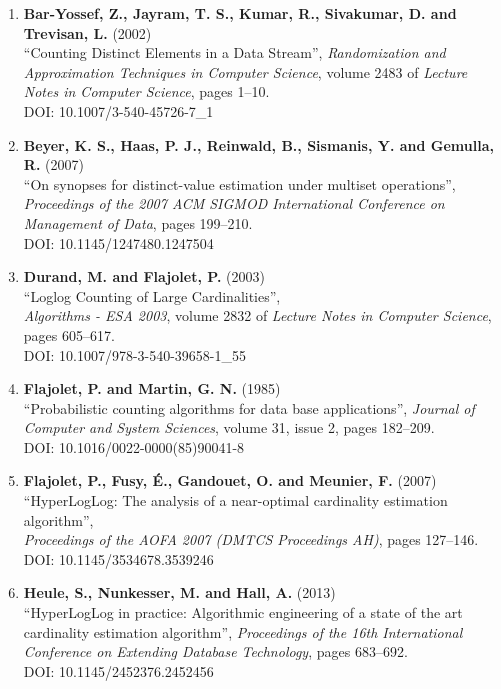 \begin{enumerate}[label={\arabic*}, noitemsep]
    \selectfont
    \item \label{baryossef2002} \textbf{Bar-Yossef, Z., Jayram, T. S., Kumar, R., Sivakumar, D. and Trevisan, L.} (2002) \\ ``Counting Distinct Elements in a Data Stream'', \textsl{Randomization and Approximation Techniques in Computer Science}, volume 2483 of \textsl{Lecture Notes in Computer Science}, pages 1--10. \\ DOI: 10.1007/3-540-45726-7\_1
    \item \label{beyer2007} \textbf{Beyer, K. S., Haas, P. J., Reinwald, B., Sismanis, Y. and Gemulla, R.} (2007) \\ ``On synopses for distinct-value estimation under multiset operations'', \textsl{Proceedings of the 2007 ACM SIGMOD International Conference on Management of Data}, pages 199--210.\\ DOI: 10.1145/1247480.1247504
    \item \label{durand2003} \textbf{Durand, M. and Flajolet, P.} (2003) \\ ``Loglog Counting of Large Cardinalities'', \\ \textsl{Algorithms - ESA 2003}, volume 2832 of \textsl{Lecture Notes in Computer Science}, pages 605--617. \\ DOI: 10.1007/978-3-540-39658-1\_55
    \item \label{flajolet1985} \textbf{Flajolet, P. and Martin, G. N.} (1985) \\ ``Probabilistic counting algorithms for data base applications'', \textsl{Journal of Computer and System Sciences}, volume 31, issue 2, pages 182--209. \\ DOI: 10.1016/0022-0000(85)90041-8
    \item \label{flajolet2007} \textbf{Flajolet, P., Fusy, \'E., Gandouet, O. and Meunier, F.} (2007) \\ ``HyperLogLog: The analysis of a near-optimal cardinality estimation algorithm'', \\ \textsl{Proceedings of the AOFA 2007 (DMTCS Proceedings AH)}, pages 127--146. \\ DOI: 10.1145/3534678.3539246
    \item \label{heule2013} \textbf{Heule, S., Nunkesser, M. and Hall, A.} (2013) \\ ``HyperLogLog in practice: Algorithmic engineering of a state of the art cardinality estimation algorithm'', \textsl{Proceedings of the 16th International Conference on Extending Database Technology}, pages 683--692. \\ DOI: 10.1145/2452376.2452456

\end{enumerate}
